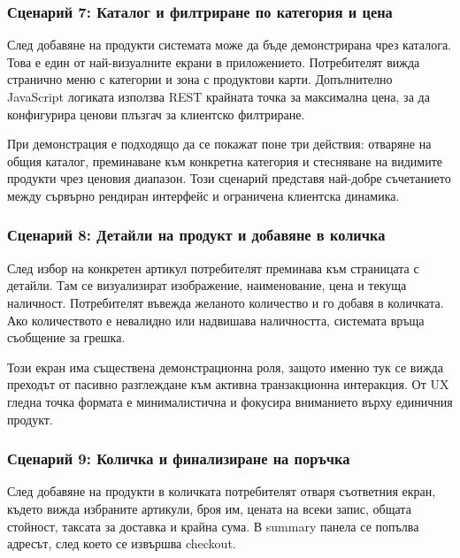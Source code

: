 \subsubsection{Сценарий 7: Каталог и филтриране по категория и цена}

След добавяне на продукти системата може да бъде демонстрирана чрез каталога. Това е един от най-визуалните екрани в приложението. Потребителят вижда странично меню с категории и зона с продуктови карти. Допълнително JavaScript логиката използва REST крайната точка за максимална цена, за да конфигурира ценови плъзгач за клиентско филтриране.

При демонстрация е подходящо да се покажат поне три действия: отваряне на общия каталог, преминаване към конкретна категория и стесняване на видимите продукти чрез ценовия диапазон. Този сценарий представя най-добре съчетанието между сървърно рендиран интерфейс и ограничена клиентска динамика.


\subsubsection{Сценарий 8: Детайли на продукт и добавяне в количка}

След избор на конкретен артикул потребителят преминава към страницата с детайли. Там се визуализират изображение, наименование, цена и текуща наличност. Потребителят въвежда желаното количество и го добавя в количката. Ако количеството е невалидно или надвишава наличността, системата връща съобщение за грешка.

Този екран има съществена демонстрационна роля, защото именно тук се вижда преходът от пасивно разглеждане към активна транзакционна интеракция. От UX гледна точка формата е минималистична и фокусира вниманието върху единичния продукт.


\subsubsection{Сценарий 9: Количка и финализиране на поръчка}

След добавяне на продукти в количката потребителят отваря съответния екран, където вижда избраните артикули, броя им, цената на всеки запис, общата стойност, таксата за доставка и крайна сума. В summary панела се попълва адресът, след което се извършва checkout.

